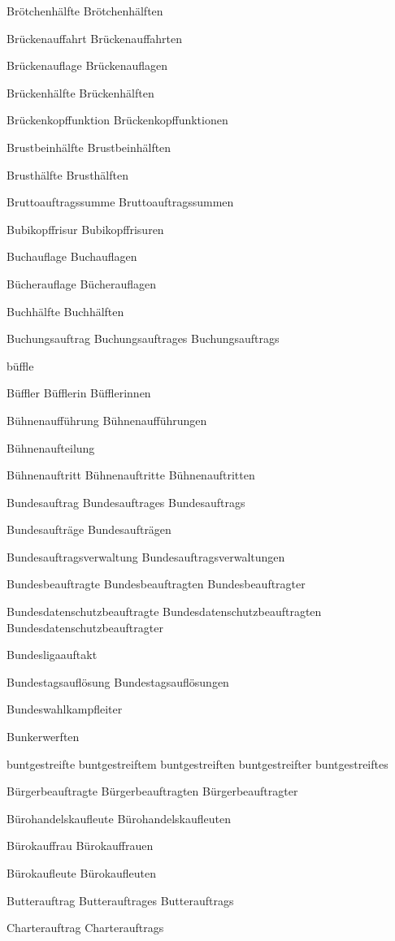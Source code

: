 Brötchenhälfte
Brötchenhälften

Brückenauffahrt
Brückenauffahrten

Brückenauflage
Brückenauflagen

Brückenhälfte
Brückenhälften

Brückenkopffunktion
Brückenkopffunktionen

Brustbeinhälfte
Brustbeinhälften

Brusthälfte
Brusthälften

Bruttoauftragssumme
Bruttoauftragssummen

Bubikopffrisur
Bubikopffrisuren

Buchauflage
Buchauflagen

Bücherauflage
Bücherauflagen

Buchhälfte
Buchhälften

Buchungsauftrag
Buchungsauftrages
Buchungsauftrags

büffle

Büffler
Büfflerin
Büfflerinnen

Bühnenaufführung
Bühnenaufführungen

Bühnenaufteilung

Bühnenauftritt
Bühnenauftritte
Bühnenauftritten

Bundesauftrag
Bundesauftrages
Bundesauftrags

Bundesaufträge
Bundesaufträgen

Bundesauftragsverwaltung
Bundesauftragsverwaltungen

Bundesbeauftragte
Bundesbeauftragten
Bundesbeauftragter

Bundesdatenschutzbeauftragte
Bundesdatenschutzbeauftragten
Bundesdatenschutzbeauftragter

Bundesligaauftakt

Bundestagsauflösung
Bundestagsauflösungen

Bundeswahlkampfleiter

Bunkerwerften

buntgestreifte
buntgestreiftem
buntgestreiften
buntgestreifter
buntgestreiftes

Bürgerbeauftragte
Bürgerbeauftragten
Bürgerbeauftragter

Bürohandelskaufleute
Bürohandelskaufleuten

Bürokauffrau
Bürokauffrauen

Bürokaufleute
Bürokaufleuten

Butterauftrag
Butterauftrages
Butterauftrags

Charterauftrag
Charterauftrags

